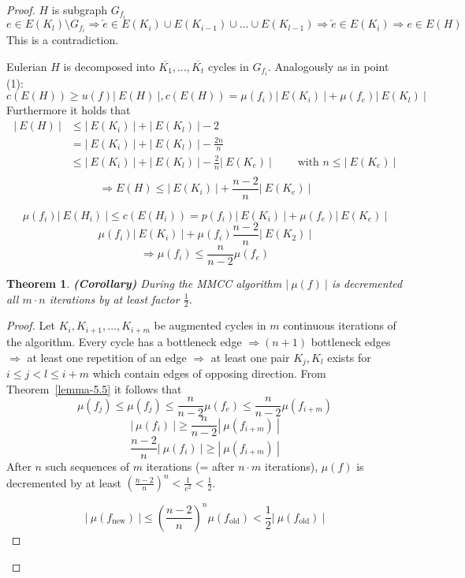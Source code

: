 \documentclass{article}
\newtheorem{theorem}{Theorem}
\newcommand{\card}[1]{\left|\:\!#1\:\!\right|}
\begin{document}
\begin{proof}
  $H$ is subgraph $G_{f_i}$
  \[ e \in E(K_l) \setminus G_{f_i} \Rightarrow \overleftarrow{e} \in E(K_i) \cup E(K_{i-1}) \cup \ldots \cup E(K_{l-1}) \Rightarrow \overleftarrow{e} \in E(K_i) \Rightarrow e \in E(H) \]
  This is a contradiction.

  Eulerian $H$ is decomposed into $\overline{K_1}, \ldots, \overline{K_t}$ cycles in $G_{f_i}$.
  Analogously as in point (1):
  \[ c(E(H)) \geq u(f) \card{E(H)}, c(E(H)) = \mu(f_i) \card{E(K_i)} + \mu(f_e) \card{E(K_l)} \]
  Furthermore it holds that
  \begin{align*}
    \card{E(H)}
      & \leq \card{E(K_i)} + \card{E(K_l)} - 2 \\
      & = \card{E(K_i)} + \card{E(K_l)} - \frac{2n}{n} \\
      & \leq \card{E(K_i)} + \card{E(K_l)} - \frac2n \card{E(K_e)} \qquad \text{ with } n \leq \card{E(K_e)} \\
  \end{align*}
  \[
    \Rightarrow E(H) \leq \card{E(K_i)} + \frac{n-2}{n} \card{E(K_e)}
  \]

  \[ \mu(f_i) \card{E(H_i)} \leq c(E(H_i)) = p(f_i) \card{E(K_i)} + \mu(f_e)\card{E(K_e)} \]
  \[ \mu(f_i) \card{E(K_i)} + \mu(f_i) \frac{n-2}{n} \card{E(K_2)} \]
  \[ \Rightarrow \mu(f_i) \leq \frac{n}{n-2} \mu(f_e) \]

  \begin{theorem}
    \textbf{(Corollary)}
    During the MMCC algorithm $\card{\mu(f)}$ is decremented all $m\cdot n$ iterations by at least factor $\frac12$.
  \end{theorem}
  \begin{proof}
    Let $K_i, K_{i+1}, \ldots, K_{i+m}$ be augmented cycles in $m$ continuous iterations of the algorithm.
    Every cycle has a bottleneck edge $\Rightarrow (n+1)$ bottleneck edges $\Rightarrow$ at least one repetition of an edge $\Rightarrow$ at least one pair $K_j, K_l$ exists for $i \leq j < l \leq i + m$ which contain edges of opposing direction. From Theorem~\ref{lemma-5.5} it follows that
    \[
      \mu(f_j) \leq \mu(f_j) \leq \frac{n}{n-2} \mu(f_e) \leq \frac{n}{n-2} \mu(f_{i+m})
    \] \[
      \card{\mu(f_i)} \geq \frac{n}{n-2} \card{\mu(f_{i+m})}
    \] \[
      \frac{n-2}{n} \card{\mu(f_i)} \geq \card{\mu(f_{i+m})}
    \]
    After $n$ such sequences of $m$ iterations (= after $n\cdot m$ iterations), $\mu(f)$ is decremented by at least $\left(\frac{n-2}{n}\right)^n < \frac{1}{e^2} < \frac12$.

    \[
      \card{\mu(f_{\text{new}})} \leq \left(\frac{n-2}{n}\right)^n \mu(f_{\text{old}}) < \frac12 \card{\mu(f_{\text{old}})}
    \]
  \end{proof}
\end{proof}
\end{document}
